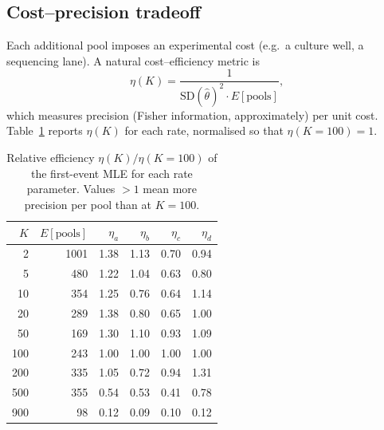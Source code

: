 \documentclass[12pt]{article}
\begin{document}
\subsection{Cost--precision tradeoff}
\label{sec:cost_tradeoff}

Each additional pool imposes an experimental cost (e.g.\ a culture well, a
sequencing lane).  A natural cost--efficiency metric is
\[
  \eta(K) = \frac{1}{\mathrm{SD}(\hat\theta)^2 \cdot E[\text{pools}]},
\]
which measures precision (Fisher information, approximately) per unit cost.
Table~\ref{tab:efficiency} reports $\eta(K)$ for each rate, normalised so that
$\eta(K=100) = 1$.

\begin{table}[H]
\centering
\caption{Relative efficiency $\eta(K)/\eta(K{=}100)$ of the first-event MLE
         for each rate parameter.  Values $>1$ mean more precision per pool
         than at $K = 100$.}
\label{tab:efficiency}
\begin{tabular}{rrrrrr}
\toprule
$K$ & $E[\text{pools}]$ & $\eta_a$ & $\eta_b$ & $\eta_c$ & $\eta_d$ \\
\midrule
   2 & 1001 & 1.38 & 1.13 & 0.70 & 0.94 \\
   5 &  480 & 1.22 & 1.04 & 0.63 & 0.80 \\
  10 &  354 & 1.25 & 0.76 & 0.64 & 1.14 \\
  20 &  289 & 1.38 & 0.80 & 0.65 & 1.00 \\
  50 &  169 & 1.30 & 1.10 & 0.93 & 1.09 \\
 100 &  243 & 1.00 & 1.00 & 1.00 & 1.00 \\
 200 &  335 & 1.05 & 0.72 & 0.94 & 1.31 \\
 500 &  355 & 0.54 & 0.53 & 0.41 & 0.78 \\
 900 &   98 & 0.12 & 0.09 & 0.10 & 0.12 \\
\bottomrule
\end{tabular}
\end{table}
\end{document}
